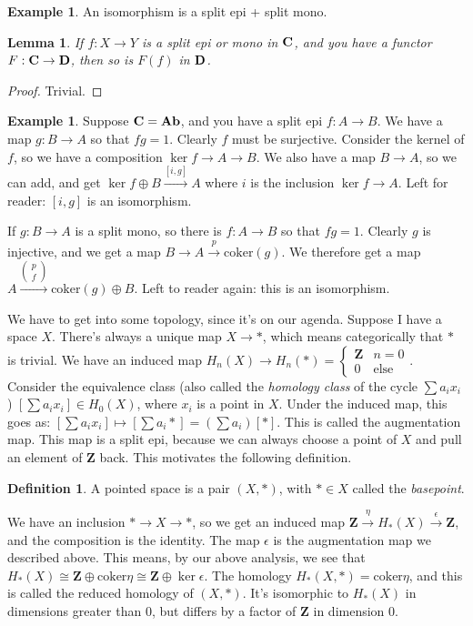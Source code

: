 \documentclass{amsart}
\theoremstyle{theorem}
\newtheorem{lemma}[theorem]{Lemma}
\theoremstyle{definition}
\newtheorem{definition}[theorem]{Definition}
\newtheorem{example}[theorem]{Example}
\begin{document}
\begin{example}
An isomorphism is a split epi + split mono.
\end{example}
\begin{lemma}
If $f:X\to Y$ is a split epi or mono in $\mathbf C$, and you have a functor $F:\mathbf C\to \mathbf D$, then so is $F(f)$ in $\mathbf D$.
\end{lemma}
\begin{proof}
Trivial.
\end{proof}
\begin{example}
Suppose $\mathbf C=\mathbf{Ab}$, and you have a split epi $f:A\to B$. We have a map $g:B\to A$ so that $fg=1$. Clearly $f$ must be surjective. Consider the kernel of $f$, so we have a composition $\ker f\to A\to B$. We also have a map $B\to A$, so we can add, and get $\ker f\oplus B\xrightarrow{[i,g]} A$ where $i$ is the inclusion $\ker f\to A$. Left for reader: $[i,g]$ is an isomorphism.

If $g:B\to A$ is a split mono, so there is $f:A\to B$ so that $fg=1$. Clearly $g$ is injective, and we get a map $B\to A\xrightarrow{p}\mathrm{coker}(g)$. We therefore get a map $A\xrightarrow{\begin{pmatrix}
p \\ f
\end{pmatrix}}\mathrm{coker}(g)\oplus B$. Left to reader again: this is an isomorphism.
\end{example}
We have to get into some topology, since it's on our agenda. Suppose I have a space $X$. There's always a unique map $X\to\ast$, which means categorically that $\ast$ is trivial. We have an induced map $ H_n(X)\to H_n(\ast)=\begin{cases}\mathbf{Z} & n=0\\
0 & \text{else}\end{cases}$. Consider the equivalence class (also called the \textit{homology class} of the cycle $\sum a_ix_i$) $\left[\sum a_ix_i\right]\in H_0(X)$, where $x_i$ is a point in $X$. Under the induced map, this goes as: $\left[\sum a_ix_i\right]\mapsto \left[\sum a_i\ast\right]=\left(\sum a_i\right)\left[\ast\right]$. This is called the augmentation map. This map is a split epi, because we can always choose a point of $X$ and pull an element of $\mathbf{Z}$ back. This motivates the following definition.
\begin{definition}
A pointed space is a pair $(X,\ast)$, with $\ast\in X$ called the \textit{basepoint}.
\end{definition}
We have an inclusion $\ast\to X\to\ast$, so we get an induced map $\mathbf{Z}\xrightarrow{\eta} H_\ast(X)\xrightarrow{\epsilon}\mathbf{Z}$, and the composition is the identity. The map $\epsilon$ is the augmentation map we described above. This means, by our above analysis, we see that $ H_\ast(X)\cong \mathbf{Z}\oplus\mathrm{coker}\eta \cong\mathbf{Z}\oplus\ker\epsilon$. The homology $ H_\ast(X,\ast)=\mathrm{coker}\eta$, and this is called the reduced homology of $(X,\ast)$. It's isomorphic to $ H_\ast(X)$ in dimensions greater than $0$, but differs by a factor of $\mathbf{Z}$ in dimension $0$.
\end{document}
